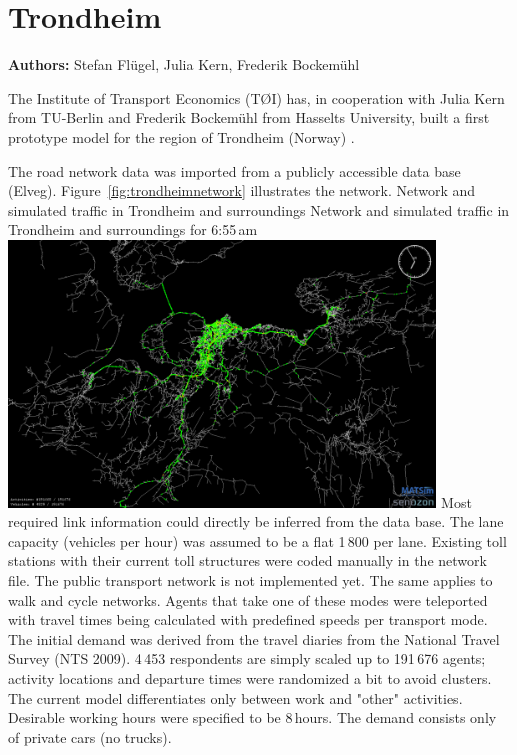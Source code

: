 \section{Trondheim}
\label{sec:trondheim}
\hfill \textbf{Authors:} Stefan Flügel, Julia Kern, Frederik Bockemühl

The Institute of Transport Economics (TØI) has, in cooperation with Julia Kern from TU-Berlin and Frederik Bockemühl from Hasselts University, built a first prototype model for the region of Trondheim (Norway) \citep[][]{FluegelKern_unpub_WTS_2014}.

The road network data was imported from a publicly accessible data base (Elveg). Figure~\ref{fig:trondheimnetwork} illustrates the network. 
%
\createfigure%
{Network and simulated traffic in Trondheim and surroundings}%
{Network and simulated traffic in Trondheim and surroundings for 6:55\,am \citep[source][]{FluegelEtAl_Samferdsel_2014}}%
{\label{fig:trondheimnetwork}}%
{\includegraphics[width=0.85\textwidth, angle=0]{./using/figures/trondheimnetwork.png}}%
{}
%
Most required link information could directly be inferred from the data base. The lane capacity (vehicles per hour) was assumed to be a flat 1\,800 per lane. Existing toll stations with their current toll structures were coded manually in the network file. The public transport network is not implemented yet. The same applies to walk and cycle networks. Agents that take one of these modes were teleported with travel times being calculated with predefined speeds per transport mode. 
The initial demand was derived from the travel diaries from the National Travel Survey (NTS 2009). 4\,453 respondents are simply scaled up to 191\,676 agents; activity locations and departure times were randomized a bit to avoid clusters. The current model differentiates only between work and "other" activities. Desirable working hours were specified to be 8\,hours. The demand consists only of private cars (no trucks). 

